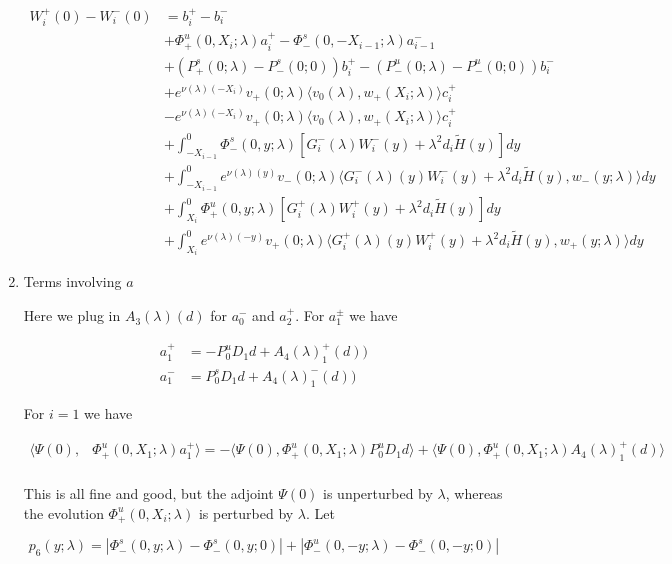 \documentclass[12pt]{article}
\begin{document}
\begin{enumerate}
\begin{align*}
W_i^+(0) - W_i^-(0) &= b_i^+ - b_i^- \\
&+ \Phi^u_+(0, X_i; \lambda)a_i^+ - \Phi^s_-(0, -X_{i-1}; \lambda)a_{i-1}^- \\
&+(P^s_+(0; \lambda) - P^s_-(0; 0))b_i^+  - (P^u_-(0; \lambda) - P^u_-(0; 0))b_i^- \\
&+ e^{\nu(\lambda)(-X_i)} v_+(0; \lambda) \langle v_0(\lambda), w_+(X_i; \lambda) \rangle c_i^+ \\
&- e^{\nu(\lambda)(-X_i)} v_+(0; \lambda) \langle v_0(\lambda), w_+(X_i; \lambda) \rangle c_i^+ \\
&+ \int_{-X_{i-1}}^0 \Phi^s_-(0, y; \lambda) [ G_i^-(\lambda)W_i^-(y) + \lambda^2 d_i \tilde{H}(y) ] dy \\
&+ \int_{-X_{i-1}}^0
e^{\nu(\lambda)(y)} v_-(0; \lambda) \langle G_i^-(\lambda)(y)W_i^-(y) + \lambda^2 d_i \tilde{H}(y), w_-(y; \lambda) \rangle dy \\
&+ \int_{X_i}^0 \Phi^u_+(0, y; \lambda) [ G_i^+(\lambda)W_i^+(y) + \lambda^2 d_i \tilde{H}(y) ] dy \\
&+ \int_{X_i}^0 e^{\nu(\lambda)(-y)} v_+(0; \lambda) \langle G_i^+(\lambda)(y)W_i^+(y) + \lambda^2 d_i \tilde{H}(y), w_+(y; \lambda) \rangle dy
\end{align*}

\item Terms involving $a$

Here we plug in $A_3(\lambda)(d)$ for $a_0^-$ and $a_2^+$. For $a_1^\pm$ we have

\begin{align*}
a_1^+ &= -P^u_0 D_1 d + A_4(\lambda)_1^+(d))\\
a_1^- &=  P^s_0 D_1 d + A_4(\lambda)_1^-(d))
\end{align*}

For $i = 1$ we have

\begin{align*}
\langle \Psi(0), &\Phi^u_+(0, X_1; \lambda) a_1^+ \rangle = -\langle \Psi(0), \Phi^u_+(0, X_1; \lambda) P^u_0 D_1 d \rangle + \langle \Psi(0), \Phi^u_+(0, X_1; \lambda) A_4(\lambda)_1^+(d) \rangle \\
\end{align*}

This is all fine and good, but the adjoint $\Psi(0)$ is unperturbed by $\lambda$, whereas the evolution $\Phi^u_+(0, X_i; \lambda)$ is perturbed by $\lambda$. Let

\[
p_6(y; \lambda) = |\Phi^s_-(0, y; \lambda) - \Phi^s_-(0, y; 0)| + |\Phi^u_-(0, -y; \lambda) - \Phi^s_-(0, -y; 0)| 
\]


\end{enumerate}
\end{document}
